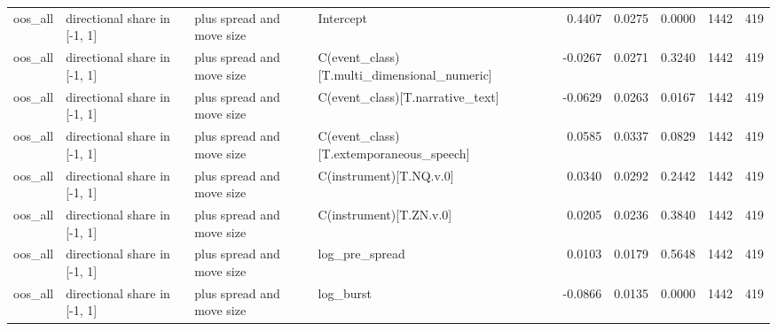 \begin{tabular}{llllrrrrr}
oos_all & directional share in [-1, 1] & plus spread and move size & Intercept & 0.4407 & 0.0275 & 0.0000 & 1442 & 419 \\
oos_all & directional share in [-1, 1] & plus spread and move size & C(event_class)[T.multi_dimensional_numeric] & -0.0267 & 0.0271 & 0.3240 & 1442 & 419 \\
oos_all & directional share in [-1, 1] & plus spread and move size & C(event_class)[T.narrative_text] & -0.0629 & 0.0263 & 0.0167 & 1442 & 419 \\
oos_all & directional share in [-1, 1] & plus spread and move size & C(event_class)[T.extemporaneous_speech] & 0.0585 & 0.0337 & 0.0829 & 1442 & 419 \\
oos_all & directional share in [-1, 1] & plus spread and move size & C(instrument)[T.NQ.v.0] & 0.0340 & 0.0292 & 0.2442 & 1442 & 419 \\
oos_all & directional share in [-1, 1] & plus spread and move size & C(instrument)[T.ZN.v.0] & 0.0205 & 0.0236 & 0.3840 & 1442 & 419 \\
oos_all & directional share in [-1, 1] & plus spread and move size & log_pre_spread & 0.0103 & 0.0179 & 0.5648 & 1442 & 419 \\
oos_all & directional share in [-1, 1] & plus spread and move size & log_burst & -0.0866 & 0.0135 & 0.0000 & 1442 & 419 \\
\bottomrule
\end{tabular}
